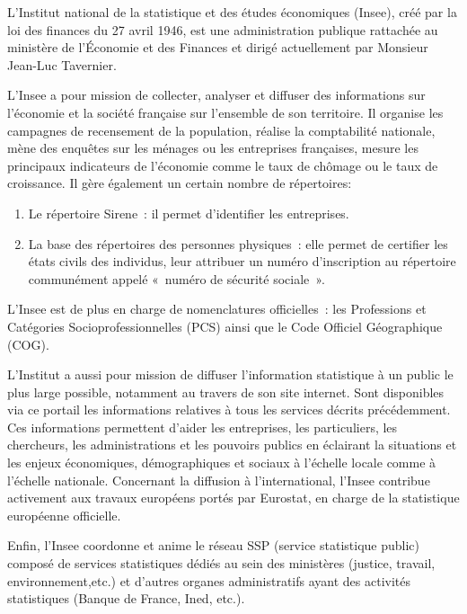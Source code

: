 L'Institut national de la statistique et des études économiques (Insee), créé par la loi des finances du 27 avril 1946, est une administration publique rattachée au ministère de l'Économie et des Finances et dirigé actuellement par Monsieur Jean-Luc Tavernier.
\newline

L'Insee a pour mission de collecter, analyser et diffuser des informations sur l'économie et la société française sur l'ensemble de son territoire. Il organise les campagnes de recensement de la population, réalise la comptabilité nationale, mène des enquêtes sur les ménages ou les entreprises françaises, mesure les principaux indicateurs de l'économie comme le taux de chômage ou le taux de croissance. Il gère également un certain nombre de répertoires:
\begin{enumerate}
    \item Le répertoire Sirene~: il permet d'identifier les entreprises.
    \item La base des répertoires des personnes physiques~: elle permet de certifier les états civils des individus, leur attribuer un numéro d'inscription au répertoire communément appelé «~numéro de sécurité sociale~».
\end{enumerate}

L'Insee est de plus en charge de nomenclatures officielles~: les Professions et Catégories Socioprofessionnelles (PCS) ainsi que le Code Officiel Géographique (COG).
\newline

L'Institut a aussi pour mission de diffuser l'information statistique à un public le plus large possible, notamment au travers de son site internet. Sont disponibles via ce portail les informations relatives à tous les services décrits précédemment. Ces informations permettent d'aider les entreprises, les particuliers, les chercheurs, les administrations et les pouvoirs publics en éclairant la situations et les enjeux économiques, démographiques et sociaux à l'échelle locale comme à l'échelle nationale. Concernant la diffusion à l'international, l'Insee contribue activement aux travaux européens portés par Eurostat, en charge de la statistique européenne officielle.
\newline

Enfin, l’Insee coordonne et anime le réseau SSP (service statistique public) composé de services statistiques dédiés au sein des ministères (justice, travail, environnement,etc.) et d’autres organes administratifs ayant des activités statistiques (Banque de France, Ined, etc.).
\newline

